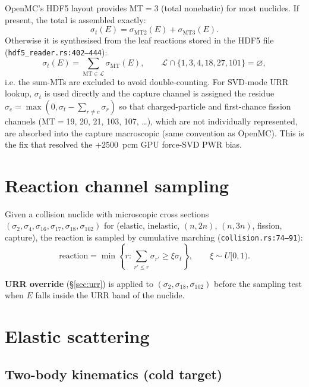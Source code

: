 \documentclass[11pt,a4paper]{article}
\begin{document}
OpenMC's HDF5 layout provides MT$=3$ (total nonelastic) for most
nuclides. If present, the total is assembled exactly:
\begin{equation}
\sigma_t(E) = \sigma_{\mathrm{MT2}}(E) + \sigma_{\mathrm{MT3}}(E).
\end{equation}
Otherwise it is synthesised from the leaf reactions stored in
the HDF5 file (\texttt{hdf5\_reader.rs:402--444}):
\begin{equation}
\sigma_t(E) = \sum_{\mathrm{MT} \in \mathcal{L}} \sigma_\mathrm{MT}(E),
\qquad
\mathcal{L} \cap \{1, 3, 4, 18, 27, 101\} = \varnothing,
\end{equation}
i.e. the sum-MTs are excluded to avoid double-counting. For
SVD-mode URR lookup, $\sigma_t$ is used directly and the
capture channel is assigned the residue
$\sigma_c = \max(0, \sigma_t - \sum_{r \neq c} \sigma_r)$ so that
charged-particle and first-chance fission channels (MT$=$19, 20,
21, 103, 107, \ldots), which are not individually represented,
are absorbed into the capture macroscopic (same convention as
OpenMC). This is the fix that resolved the
$+2500$~pcm GPU force-SVD PWR bias.

\section{Reaction channel sampling}

Given a collision nuclide with microscopic cross sections
$(\sigma_2, \sigma_4, \sigma_{16}, \sigma_{17}, \sigma_{18},
\sigma_{102})$ for (elastic, inelastic, $(n,2n)$, $(n,3n)$,
fission, capture), the reaction is sampled by cumulative marching
(\texttt{collision.rs:74--91}):
\begin{equation}
\text{reaction} = \min\left\{r : \sum_{r' \leq r} \sigma_{r'} \geq
\xi \sigma_t\right\},
\qquad \xi \sim U[0, 1).
\end{equation}

\textbf{URR override} (\S\ref{sec:urr}) is applied to
$(\sigma_2, \sigma_{18}, \sigma_{102})$ before the sampling test
when $E$ falls inside the URR band of the nuclide.

\section{Elastic scattering}

\subsection{Two-body kinematics (cold target)}
\end{document}
